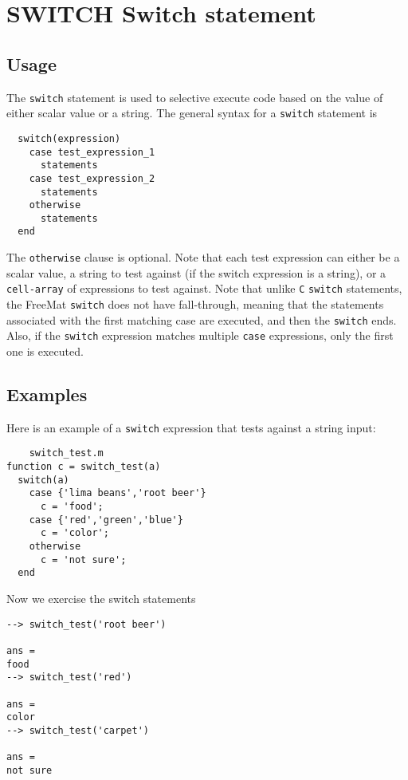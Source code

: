 \section{SWITCH Switch statement}

\subsection{Usage}

The \verb|switch| statement is used to selective execute code
based on the value of either scalar value or a string.
The general syntax for a \verb|switch| statement is
\begin{verbatim}
  switch(expression)
    case test_expression_1
      statements
    case test_expression_2
      statements
    otherwise
      statements
  end
\end{verbatim}
The \verb|otherwise| clause is optional.  Note that each test
expression can either be a scalar value, a string to test
against (if the switch expression is a string), or a
\verb|cell-array| of expressions to test against.  Note that
unlike \verb|C| \verb|switch| statements, the FreeMat \verb|switch|
does not have fall-through, meaning that the statements
associated with the first matching case are executed, and
then the \verb|switch| ends.  Also, if the \verb|switch| expression
matches multiple \verb|case| expressions, only the first one
is executed.
\subsection{Examples}

Here is an example of a \verb|switch| expression that tests
against a string input:
\begin{verbatim}
    switch_test.m
function c = switch_test(a)
  switch(a)
    case {'lima beans','root beer'}
      c = 'food';
    case {'red','green','blue'}
      c = 'color';
    otherwise
      c = 'not sure';
  end
\end{verbatim}
Now we exercise the switch statements
\begin{verbatim}
--> switch_test('root beer')

ans = 
food
--> switch_test('red')

ans = 
color
--> switch_test('carpet')

ans = 
not sure
\end{verbatim}
